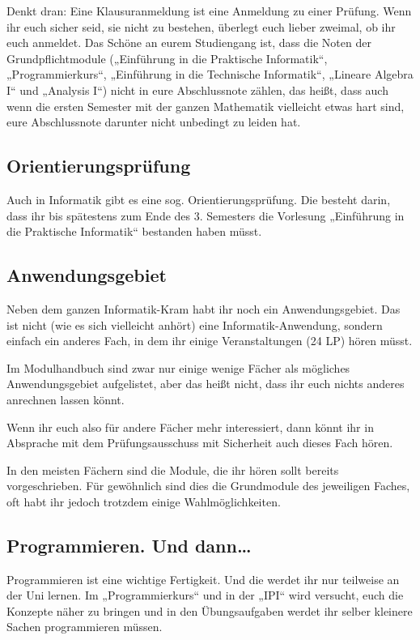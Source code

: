 Denkt dran: Eine Klausuranmeldung ist eine Anmeldung zu einer Prüfung. Wenn ihr euch sicher seid, sie nicht zu bestehen, überlegt euch lieber zweimal, ob ihr euch anmeldet. Das Schöne an eurem Studiengang ist, dass die Noten der Grundpflichtmodule („Einführung in die Praktische Informatik“, „Programmierkurs“, „Einführung in die Technische Informatik“, „Lineare Algebra I“ und „Analysis I“) nicht in eure Abschlussnote zählen, das heißt, dass auch wenn die ersten Semester mit der ganzen Mathematik vielleicht etwas hart sind, eure Abschlussnote darunter nicht unbedingt zu leiden hat.


\subsection{Orientierungsprüfung}

Auch in Informatik gibt es eine sog. Orientierungsprüfung. Die besteht darin, dass ihr bis spätestens zum Ende des 3. Semesters die Vorlesung „Einführung in die Praktische Informatik“ bestanden haben müsst.


\subsection{Anwendungsgebiet}

Neben dem ganzen Informatik-Kram habt ihr noch ein Anwendungsgebiet. Das ist nicht (wie es sich vielleicht anhört) eine Informatik-Anwendung, sondern einfach ein anderes Fach, in dem ihr einige Veranstaltungen (24 \gls{LP}) hören müsst.

Im Modulhandbuch sind zwar nur einige wenige Fächer als mögliches Anwendungsgebiet aufgelistet, aber das heißt nicht, dass ihr euch nichts anderes anrechnen lassen könnt.

Wenn ihr euch also für andere Fächer mehr interessiert, dann könnt ihr in Absprache mit dem Prüfungsausschuss mit Sicherheit auch dieses Fach hören.

In den meisten Fächern sind die Module, die ihr hören sollt bereits vorgeschrieben. Für gewöhnlich sind dies die Grundmodule des jeweiligen Faches, oft habt ihr jedoch trotzdem einige Wahlmöglichkeiten.


\subsection{Programmieren. Und dann\dots}

Programmieren ist eine wichtige Fertigkeit. Und die werdet ihr nur teilweise an der Uni lernen. Im „Programmierkurs“ und in der „IPI“ wird versucht, euch die Konzepte näher zu bringen und in den Übungsaufgaben werdet ihr selber kleinere Sachen programmieren müssen.


